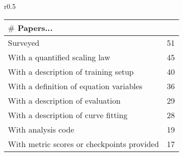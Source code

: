 \vspace{-2mm}
\begin{wrapfigure}{r}{0.5\columnwidth}
 \centering
\begin{tabular}{lc}
\toprule
 $\#$ Papers... & \\ \midrule
Surveyed & 51 \\ 
With a quantified scaling law & 45 \\
With a description of training setup & 40 \\
With a definition of equation variables & 36 \\
With a description of evaluation & 29 \\
With a description of curve fitting & 28 \\
With analysis code & 19 \\
With metric scores or checkpoints provided & 17 \\\bottomrule
\end{tabular}%
\label{tab:summary} 
  \vspace{-3mm}
\end{wrapfigure}


